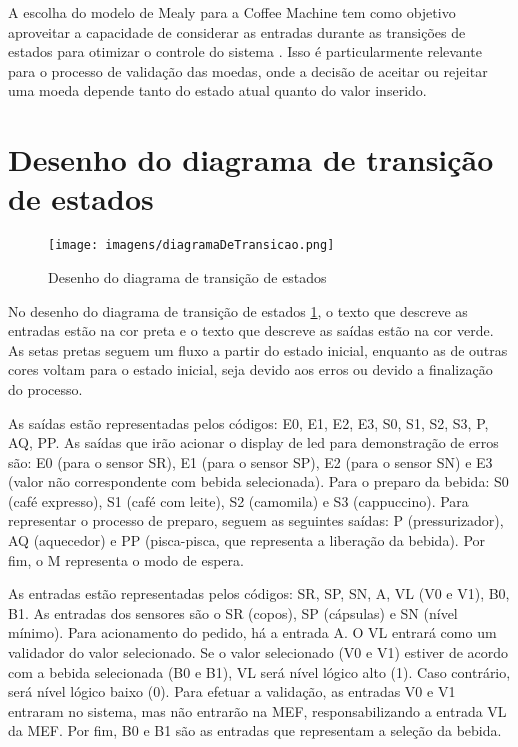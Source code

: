 A escolha do modelo de Mealy para a Coffee Machine tem como objetivo aproveitar a capacidade de considerar as entradas durante as transições de estados para otimizar o controle do sistema \cite{tocci2010sistemas}. Isso é particularmente relevante para o processo de validação das moedas, onde a decisão de aceitar ou rejeitar uma moeda depende tanto do estado atual quanto do valor inserido.

\section{Desenho do diagrama de transição de estados}

\begin{figure}[!h]
    \centering
    \texttt{[image: imagens/diagramaDeTransicao.png]}
    \caption{Desenho do diagrama de transição de estados}
    \label{fig:diagramaTransicao}
\end{figure}

No desenho do diagrama de transição de estados \ref{fig:diagramaTransicao}, o texto que descreve as entradas estão na cor preta e o texto que descreve as saídas estão na cor verde. As setas pretas seguem um fluxo a partir do estado inicial, enquanto as de outras cores voltam para o estado inicial, seja devido aos erros ou devido a finalização do processo. 

As saídas estão representadas pelos códigos:  E0, E1, E2, E3, S0, S1, S2, S3, P, AQ, PP. As saídas que irão acionar o display de led para demonstração de erros são: E0 (para o sensor SR), E1 (para o sensor SP), E2 (para o sensor SN) e E3 (valor não correspondente com bebida selecionada). Para o preparo da bebida: S0 (café expresso), S1 (café com leite), S2 (camomila) e S3 (cappuccino). Para representar o processo de preparo, seguem as seguintes saídas: P (pressurizador), AQ (aquecedor) e PP (pisca-pisca, que representa a liberação da bebida). Por fim, o M representa o modo de espera.

As entradas estão representadas pelos códigos: SR, SP, SN, A, VL (V0 e V1), B0, B1. As entradas dos sensores são o SR (copos), SP (cápsulas) e SN (nível mínimo). Para acionamento do pedido, há a entrada A. O VL entrará como um validador do valor selecionado. Se o valor selecionado (V0 e V1) estiver de acordo com a bebida selecionada (B0 e B1), VL será nível lógico alto (1). Caso contrário, será nível lógico baixo (0). Para efetuar a validação, as entradas V0 e V1 entraram no sistema, mas não entrarão na MEF, responsabilizando a entrada VL da MEF. Por fim, B0 e B1 são as entradas que representam a seleção da bebida. 

